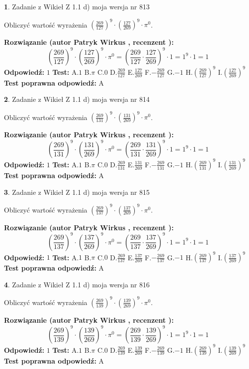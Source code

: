 \documentclass[12pt, a4paper]{article}
\theoremstyle{definition} %
\newtheorem{zad}{}
\newcommand{\zadStart}[1]{\begin{zad}#1\newline}
\newcommand{\zadStop}{\end{zad}}
\newcommand{\rozwStart}[2]{\noindent \textbf{Rozwiązanie (autor #1 , recenzent #2): }\newline}
\newcommand{\rozwStop}{\newline}
\newcommand{\odpStart}{\noindent \textbf{Odpowiedź:}\newline}
\newcommand{\odpStop}{\newline}
\newcommand{\testStart}{\noindent \textbf{Test:}\newline}
\newcommand{\testStop}{\newline}
\newcommand{\kluczStart}{\noindent \textbf{Test poprawna odpowiedź:}\newline}
\newcommand{\kluczStop}{\newline}
\begin{document}
\zadStart{Zadanie z Wikieł Z 1.1 d) moja wersja nr 813}

Obliczyć wartość wyrażenia $(\frac{269}{127})^{9} \cdot (\frac{127}{269})^{9} \cdot \pi^{0}$.
\zadStop
\rozwStart{Patryk Wirkus}{}
$$(\frac{269}{127})^{9} \cdot (\frac{127}{269})^{9} \cdot \pi^{0} = (\frac{269}{127} \cdot \frac{127}{269})^{9} \cdot 1 = 1^{9} \cdot 1 = 1$$
\rozwStop
\odpStart
$1$
\odpStop
\testStart
A.$1$ B.$\pi$ C.$0$ D.$\frac{269}{127}$ E.$\frac{127}{269}$
F.$-\frac{269}{127}$ G.$-1$
H.$(\frac{269}{127})^{9}$
I.$(\frac{127}{269})^{9}$
\testStop
\kluczStart
A
\kluczStop



\zadStart{Zadanie z Wikieł Z 1.1 d) moja wersja nr 814}

Obliczyć wartość wyrażenia $(\frac{269}{131})^{9} \cdot (\frac{131}{269})^{9} \cdot \pi^{0}$.
\zadStop
\rozwStart{Patryk Wirkus}{}
$$(\frac{269}{131})^{9} \cdot (\frac{131}{269})^{9} \cdot \pi^{0} = (\frac{269}{131} \cdot \frac{131}{269})^{9} \cdot 1 = 1^{9} \cdot 1 = 1$$
\rozwStop
\odpStart
$1$
\odpStop
\testStart
A.$1$ B.$\pi$ C.$0$ D.$\frac{269}{131}$ E.$\frac{131}{269}$
F.$-\frac{269}{131}$ G.$-1$
H.$(\frac{269}{131})^{9}$
I.$(\frac{131}{269})^{9}$
\testStop
\kluczStart
A
\kluczStop



\zadStart{Zadanie z Wikieł Z 1.1 d) moja wersja nr 815}

Obliczyć wartość wyrażenia $(\frac{269}{137})^{9} \cdot (\frac{137}{269})^{9} \cdot \pi^{0}$.
\zadStop
\rozwStart{Patryk Wirkus}{}
$$(\frac{269}{137})^{9} \cdot (\frac{137}{269})^{9} \cdot \pi^{0} = (\frac{269}{137} \cdot \frac{137}{269})^{9} \cdot 1 = 1^{9} \cdot 1 = 1$$
\rozwStop
\odpStart
$1$
\odpStop
\testStart
A.$1$ B.$\pi$ C.$0$ D.$\frac{269}{137}$ E.$\frac{137}{269}$
F.$-\frac{269}{137}$ G.$-1$
H.$(\frac{269}{137})^{9}$
I.$(\frac{137}{269})^{9}$
\testStop
\kluczStart
A
\kluczStop



\zadStart{Zadanie z Wikieł Z 1.1 d) moja wersja nr 816}

Obliczyć wartość wyrażenia $(\frac{269}{139})^{9} \cdot (\frac{139}{269})^{9} \cdot \pi^{0}$.
\zadStop
\rozwStart{Patryk Wirkus}{}
$$(\frac{269}{139})^{9} \cdot (\frac{139}{269})^{9} \cdot \pi^{0} = (\frac{269}{139} \cdot \frac{139}{269})^{9} \cdot 1 = 1^{9} \cdot 1 = 1$$
\rozwStop
\odpStart
$1$
\odpStop
\testStart
A.$1$ B.$\pi$ C.$0$ D.$\frac{269}{139}$ E.$\frac{139}{269}$
F.$-\frac{269}{139}$ G.$-1$
H.$(\frac{269}{139})^{9}$
I.$(\frac{139}{269})^{9}$
\testStop
\kluczStart
A
\kluczStop
\end{document}
